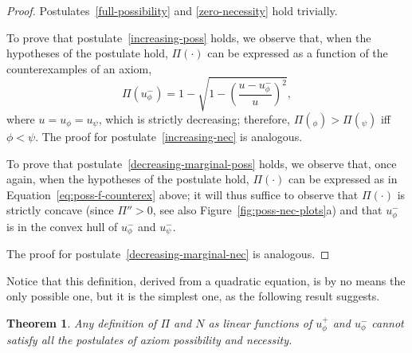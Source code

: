 \documentclass[review]{elsarticle}
\newtheorem{theorem}{Theorem}
\theoremstyle{definition}
\begin{document}
\begin{proof}
  Postulates~\ref{full-possibility} and \ref{zero-necessity} hold trivially.

  To prove that postulate~\ref{increasing-poss} holds, we observe that, when
  the hypotheses of the postulate hold,
  $\Pi(\cdot)$ can be expressed as a function of the counterexamples of an axiom,
    \begin{equation}\label{eq:poss-f-counterex}
      \Pi(u_\phi^-) = 1 - \sqrt{1 - \left(\frac{u - u_\phi^-}{u}\right)^2},
    \end{equation}
    where $u = u_\phi = u_\psi$, which is strictly decreasing; therefore,
    $\Pi(_\phi) > \Pi(_\psi)$ iff $\phi < \psi$.
  The proof for postulate~\ref{increasing-nec} is analogous.

  To prove that postulate~\ref{decreasing-marginal-poss} holds,
  we observe that, once again, when the hypotheses of the postulate hold,
  $\Pi(\cdot)$ can be expressed as in Equation~\ref{eq:poss-f-counterex} above;
  it will thus suffice to observe that $\Pi(\cdot)$ is strictly concave
  (since $\Pi'' > 0$, see also Figure~\ref{fig:poss-nec-plots}a)
  and that $u_\phi^-$ is in the convex hull of $u_\phi^-$ and $u_\psi^-$.
  
  The proof for postulate~\ref{decreasing-marginal-nec} is analogous.
\end{proof}

Notice that this definition, derived from a quadratic equation,
is by no means the only possible one, but it is the simplest one,
as the following result suggests.

\begin{theorem}
  Any definition of $\Pi$ and $N$ as linear functions of $u_\phi^+$ and $u_\phi^-$
  cannot satisfy all the postulates of axiom possibility and necessity.
\end{theorem}
\end{document}
